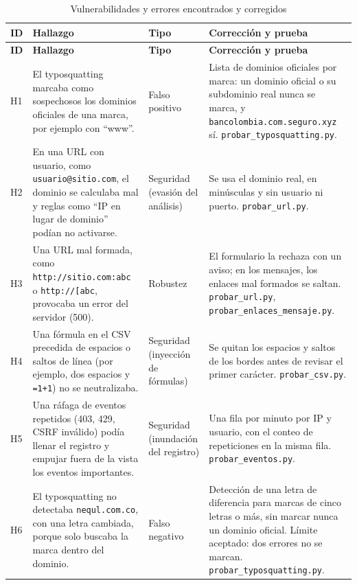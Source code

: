 \documentclass[journal,onecolumn,12pt,draftclsnofoot]{IEEEtran}
\begin{document}
\begingroup
\footnotesize
\setlength{\tabcolsep}{3pt}
\begin{longtable}{|>{\raggedright\arraybackslash}p{}|>{\raggedright\arraybackslash}p{}|>{\raggedright\arraybackslash}p{}|>{\raggedright\arraybackslash}p{}|}
\caption{Vulnerabilidades y errores encontrados y corregidos}\label{tab:hallazgos}\\
\hline
\textbf{ID} & \textbf{Hallazgo} & \textbf{Tipo} & \textbf{Corrección y prueba} \\ \hline
\endfirsthead
\hline
\textbf{ID} & \textbf{Hallazgo} & \textbf{Tipo} & \textbf{Corrección y prueba} \\ \hline
\endhead
H1 & El typosquatting marcaba como sospechosos los dominios oficiales de una marca, por ejemplo con ``www''. & Falso positivo & Lista de dominios oficiales por marca: un dominio oficial o su subdominio real nunca se marca, y \texttt{bancolombia.com.seguro.xyz} sí. \texttt{probar\_typosquatting.py}. \\ \hline
H2 & En una URL con usuario, como \texttt{usuario@sitio.com}, el dominio se calculaba mal y reglas como ``IP en lugar de dominio'' podían no activarse. & Seguridad (evasión del análisis) & Se usa el dominio real, en minúsculas y sin usuario ni puerto. \texttt{probar\_url.py}. \\ \hline
H3 & Una URL mal formada, como \texttt{http://sitio.com:abc} o \texttt{http://[abc}, provocaba un error del servidor (500). & Robustez & El formulario la rechaza con un aviso; en los mensajes, los enlaces mal formados se saltan. \texttt{probar\_url.py}, \texttt{probar\_enlaces\_mensaje.py}. \\ \hline
H4 & Una fórmula en el CSV precedida de espacios o saltos de línea (por ejemplo, dos espacios y \texttt{=1+1}) no se neutralizaba. & Seguridad (inyección de fórmulas) & Se quitan los espacios y saltos de los bordes antes de revisar el primer carácter. \texttt{probar\_csv.py}. \\ \hline
H5 & Una ráfaga de eventos repetidos (403, 429, CSRF inválido) podía llenar el registro y empujar fuera de la vista los eventos importantes. & Seguridad (inundación del registro) & Una fila por minuto por IP y usuario, con el conteo de repeticiones en la misma fila. \texttt{probar\_eventos.py}. \\ \hline
H6 & El typosquatting no detectaba \texttt{nequl.com.co}, con una letra cambiada, porque solo buscaba la marca dentro del dominio. & Falso negativo & Detección de una letra de diferencia para marcas de cinco letras o más, sin marcar nunca un dominio oficial. Límite aceptado: dos errores no se marcan. \texttt{probar\_typosquatting.py}. \\ \hline

\end{longtable}
\end{document}
